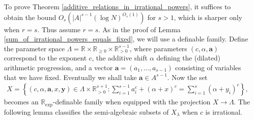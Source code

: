 \documentclass[9pt]{amsart}
\theoremstyle{my_theorem_style}
\numberwithin{definition}{section}
\newcommand{\R}{\mathbb{R}}
\renewcommand{\vec}[1]{\bm{#1}}
\begin{document}
To prove Theorem \ref{additive_relations_in_irrational_powers}, it suffices to obtain the bound $O_s(|A|^{s - 1}(\log{N})^{O_s(1)})$ for $s > 1$, which is sharper only when $r = s$. Thus assume $r = s$. As in the proof of Lemma \ref{sum_of_irrational_powers_equals_fixed}, we will use a definable family. Define the parameter space $\Lambda = \R \times \R_{\geq 0} \times \R_{>0}^{s - 1}$, where parameters $(c, \alpha, \vec{a})$ correspond to the exponent $c$, the additive shift $\alpha$ defining the (dilated) arithmetic progression, and a vector $\vec{a} = (a_1, \dots, a_{s - 1})$ consisting of variables that we have fixed. Eventually we shall take $\vec{a} \in A^{s - 1}$. Now the set
\begin{align*}
    X = \left\{(c, \alpha, \vec{a}, x, \vec{y}) \in \Lambda \times \R_{>0}^{s + 1} :
    \sum_{i = 1}^{s - 1} a_i^c + (\alpha + x)^c = 
    \sum_{i = 1}^s (\alpha + y_i)^c\right\},
\end{align*}
becomes an $\R_{\exp}$-definable family when equipped with the projection $X \to \Lambda$. The following lemma classifies the semi-algebraic subsets of $X_\lambda$ when $c$ is irrational.
\end{document}
